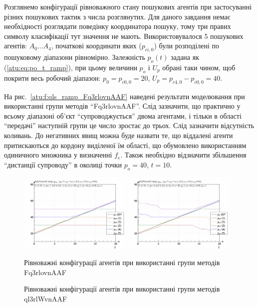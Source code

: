 \documentclass[a4paper,13pt]{atuaref}
\begin{document}
Розглянемо конфігурації рівноважного стану пошукових агентів при застосуванні
різних пошукових тактик з числа розглянутих. Для даного завдання немає
необхідності розглядати поведінку координатора пошуку, тому три правих символу
класифікації тут значення не мають.
Використовувалося 5 пошукових агентів: $ A_0 \ldots A_4 $, початкові
координати яких ($ p_ {ci,0} $) були розподілені по пошуковому діапазони
рівномірно. Залежність $ p_o (t) $ задана як (\ref{atu:eq:po_t_ramp}), при
цьому величини $ p_o $ і $ U_p $ обрані таки чином, щоб покрити весь робочий
діапазон: $ p_0 = p_{c0,0} = 20 $, $ U_p = p_ {c4,0} - p_ {c0,0} = 40 $.


На рис.~\ref{atu:f:qls_ramp_Fq3rlovnAAF} наведені результати моделювання при використанні групи методів
``Fq3rlovnAAF''. Слід зазначити, що практично у всьому діапазоні об'єкт
``супроводжується'' двома агентами, і тільки в області ``передачі'' наступній
групи це число зростає до трьох. Слід зазначити відсутність коливань. До
негативних явищ можна буде назвати те, що віддалені агенти притискаються до
кордону виділеної їм області, що обумовлено використанням одиничного множника у
визначенні $ f_e $. Також необхідно відзначити збільшення
``дистанції супроводу'' в околиці точки $ p_o = 40 $, $ t = 10 $.

\begin{figure}[htb!]
    \includegraphics[width=0.48\textwidth]{p3/p/ramp/qls-p_t_pi_Fq3rlovnAAF_ramp.png} \hfill
    \includegraphics[width=0.48\textwidth]{p3/p/ramp/qls-p_t_pi_ql3rlWvnAAF_ramp.png}
  \\
  \parbox[t]{0.48\textwidth} {
    \caption{Рівноважні конфігурації агентів при використанні групи методів  Fq3rlovnAAF}
    \label{atu:f:qls_ramp_Fq3rlovnAAF}
  }
  \hfill
  \parbox[t]{0.48\textwidth} {
    \caption{Рівноважні конфігурації агентів при використанні групи методів ql3rlWvnAAF}
    \label{atu:f:qls_ramp_ql3rlWvnAAF}
  }
\end{figure}
\end{document}
